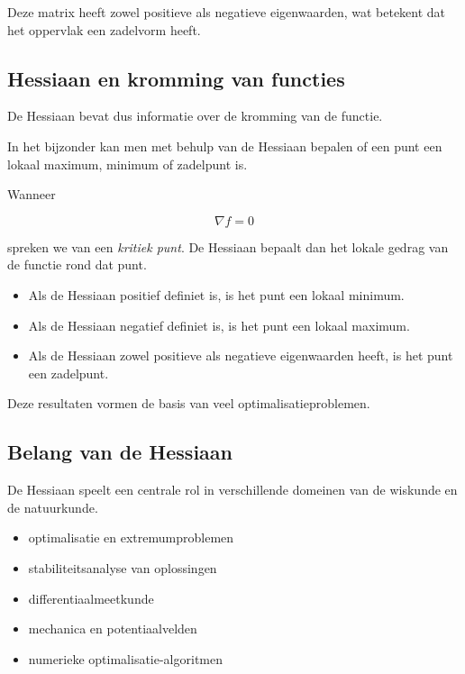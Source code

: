 \documentclass[11pt,a4paper]{article}
\begin{document}
    Deze matrix heeft zowel positieve als negatieve eigenwaarden,
    wat betekent dat het oppervlak een zadelvorm heeft.

    \subsection{Hessiaan en kromming van functies}

    De Hessiaan bevat dus informatie over de kromming van de functie.

    In het bijzonder kan men met behulp van de Hessiaan bepalen of
    een punt een lokaal maximum, minimum of zadelpunt is.

    Wanneer

    \[
        \nabla f = 0
    \]

    spreken we van een \textit{kritiek punt}. De Hessiaan bepaalt
    dan het lokale gedrag van de functie rond dat punt.

    \begin{itemize}

        \item Als de Hessiaan positief definiet is, is het punt een lokaal minimum.

        \item Als de Hessiaan negatief definiet is, is het punt een lokaal maximum.

        \item Als de Hessiaan zowel positieve als negatieve eigenwaarden heeft,
        is het punt een zadelpunt.

    \end{itemize}

    Deze resultaten vormen de basis van veel optimalisatieproblemen.

    \subsection{Belang van de Hessiaan}

    De Hessiaan speelt een centrale rol in verschillende domeinen van
    de wiskunde en de natuurkunde.

    \begin{itemize}

        \item optimalisatie en extremumproblemen

        \item stabiliteitsanalyse van oplossingen

        \item differentiaalmeetkunde

        \item mechanica en potentiaalvelden

        \item numerieke optimalisatie-algoritmen

    \end{itemize}
\end{document}
